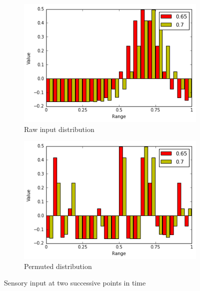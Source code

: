 \documentclass[a4paper,twoside]{article}
\begin{document}
		\begin{figure}[th!]
			\begin{subfigure}{0.45\columnwidth}
				\center
				\includegraphics[width=1\columnwidth]{img/gaussianbar.png}
				\caption{Raw input distribution}
				\label{fig:gaussianbar}
			\end{subfigure}
			\begin{subfigure}{0.45\columnwidth}
				\center
				\includegraphics[width=1\columnwidth]{img/gaussianbarperm.png}
				\caption{Permuted distribution}
				\label{fig:gaussianbarperm}
			\end{subfigure}	
		\caption{Sensory input at two successive points in time}
		\label{fig:gaussian}
		\end{figure}	
\end{document}
